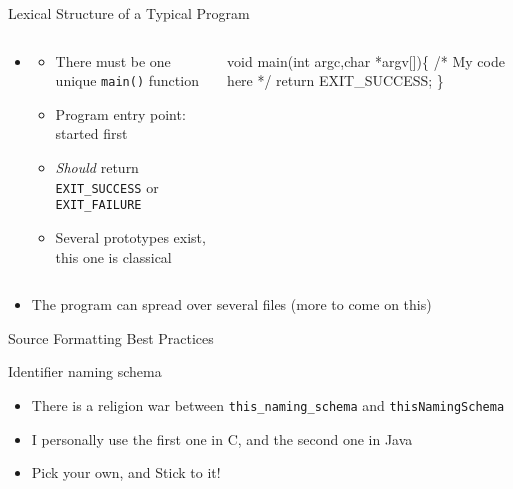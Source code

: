 \begin{Coupe}
\begin{frame}{Lexical Structure of a Typical Program}
\begin{itemize}
\begin{columns}
\begin{column}{.39\linewidth}
\begin{boitecode}{}
      \end{boitecode}
    \end{column}
  \end{columns}

\item {}
  \vspace{-.4\baselineskip}
  \begin{columns}
    \begin{column}{.6\linewidth}
      \begin{itemize}\vspace{-.8\baselineskip}
      \item There must be one unique \texttt{main()} function
      \item Program entry point: started first
      \item \textit{Should} return {\scriptsize\texttt{EXIT\_SUCCESS}} or
        {\scriptsize\texttt{EXIT\_FAILURE}}
      \item Several prototypes exist, this one is classical
      \end{itemize}
    \end{column}
    \begin{column}{.39\linewidth}
      \medskip
      \begin{boitecode}{}
void main(int argc,char *argv[])\{
  /* My code here */
  return EXIT_SUCCESS;
\}

      \end{boitecode}
    \end{column}
  \end{columns}\item The program can spread over several files (more to come on this)
\end{itemize}
\end{frame}
\begin{frame}[fragile]{Source Formatting Best Practices}
  \begin{block}{Identifier naming schema}
    \begin{itemize}
    \item There is a religion war between \texttt{\small this\_naming\_schema} and
      \texttt{\small thisNamingSchema}
    \item I personally  use the first one in C, and the second one in Java
    \item Pick your own, and {\sc Stick to it!}
    \end{itemize}
  \end{block}      \vspace{-.7\baselineskip}


\end{frame}
\end{Coupe}
